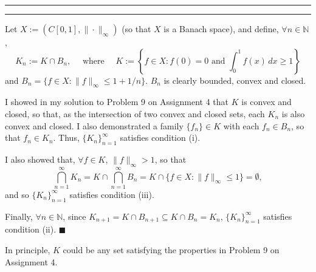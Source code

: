 \documentclass[11pt]{article}
\newcounter{questionCounter}
\newcounter{partCounter}[questionCounter]
\newenvironment{question}[2][\arabic{questionCounter}]{%
    \setcounter{partCounter}{0}%
    \vspace{.25in} \hrule \vspace{0.5em}%
        \noindent{\bf #2}%
    \vspace{0.8em} \hrule \vspace{.10in}%
    \addtocounter{questionCounter}{1}%
}{}
\renewcommand{\qed}{\quad $\blacksquare$}
\newcommand{\N}{\mathbb{N}} %
\begin{document}
\begin{question}{Problem 7}
Let $X := (C[0,1],\|\cdot\|_{\infty})$ (so that $X$ is a Banach space), and
define, $\forall n \in \N$,
\[
K_n := K \cap B_n,
\quad \mbox{ where } \quad
K := \left\{ f \in X :
        f(0) = 0 \mbox{ and }
        \int_0^1 f(x) \, dx \geq 1 \right\}
\]
and $B_n = \{f \in X : \|f\|_{\infty} \leq 1 + 1/n\}$. $B_n$ is clearly
bounded, convex and closed.

I showed in my solution to Problem 9 on Assignment 4 that $K$ is
convex and closed, so that, as the intersection of two convex and closed sets,
each $K_n$ is also convex and closed. I also demonstrated a family
$\{f_n\} \in K$ with each $f_n \in B_n$, so that $f_n \in K_n$. Thus,
$\{K_n\}_{n = 1}^{\infty}$ satisfies condition (i).

I also showed that, $\forall f \in K$, $\|f\|_{\infty} > 1$, so that
\[\bigcap_{n = 1}^{\infty} K_n
    = K \cap \bigcap_{n = 1}^{\infty} B_n
    = K \cap \{f \in X : \|f\|_{\infty} \leq 1\}
    = \emptyset,
\]
and so $\{K_n\}_{n = 1}^{\infty}$ satisfies condition (iii).

Finally, $\forall n \in \N$, since
$K_{n + 1} = K \cap B_{n + 1} \subseteq K \cap B_n = K_n$,
$\{K_n\}_{n = 1}^{\infty}$ satisfies condition (ii). \qed

In principle, $K$ could be any set satisfying the properties in Problem 9 on
Assignment 4.
\vspace{-0.1in}
\end{question}
\end{document}

